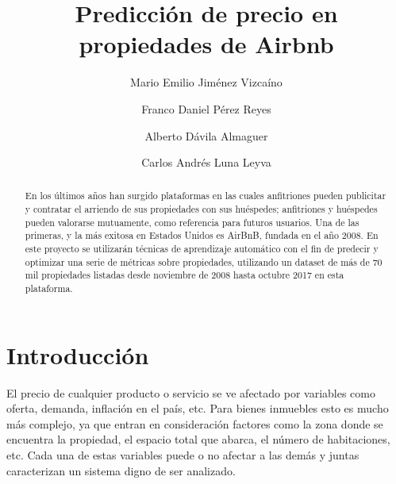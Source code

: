 \documentclass[sigconf,authorversion,nonacm]{acmart}
\begin{document}
\title{Predicción de precio en propiedades de Airbnb}

\author{Mario Emilio Jiménez Vizcaíno}

\author{Franco Daniel Pérez Reyes}

\author{Alberto Dávila Almaguer}

\author{Carlos Andrés Luna Leyva}


\begin{abstract}
En los últimos años han surgido plataformas en las cuales anfitriones pueden publicitar y contratar el arriendo de sus propiedades con sus huéspedes; anfitriones y huéspedes pueden valorarse mutuamente, como referencia para futuros usuarios. Una de las primeras, y la más exitosa en Estados Unidos es AirBnB, fundada en el año 2008. En este proyecto se utilizarán técnicas de aprendizaje automático con el fin de predecir y optimizar una serie de métricas sobre propiedades, utilizando un dataset de más de 70 mil propiedades listadas desde noviembre de 2008 hasta octubre 2017 en esta plataforma.
\end{abstract}

\maketitle

\section{Introducción}
El precio de cualquier producto o servicio se ve afectado por variables como oferta, demanda, inflación en el país, etc. Para bienes inmuebles esto es mucho más complejo, ya que entran en consideración factores como la zona donde se encuentra la propiedad, el espacio total que abarca, el número de habitaciones, etc. Cada una de estas variables puede o no afectar a las demás y juntas caracterizan un sistema digno de ser analizado.
\end{document}
